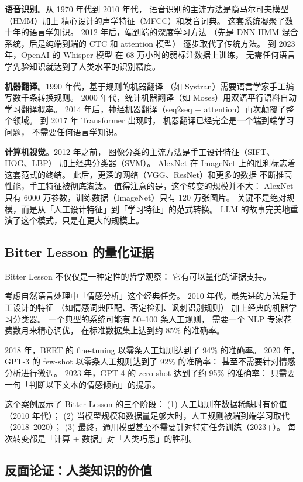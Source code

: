 \textbf{语音识别}。从 1970 年代到 2010 年代，
语音识别的主流方法是隐马尔可夫模型（HMM）加上
精心设计的声学特征（MFCC）和发音词典。
这套系统凝聚了数十年的语言学知识。
2012 年后，端到端的深度学习方法
（先是 DNN-HMM 混合系统，后是纯端到端的 CTC 和 attention 模型）
逐步取代了传统方法。
到 2023 年，OpenAI 的 Whisper 模型
在 68 万小时的弱标注数据上训练，
无需任何语言学先验知识就达到了人类水平的识别精度。

\textbf{机器翻译}。1990 年代，基于规则的机器翻译
（如 Systran）需要语言学家手工编写数千条转换规则。
2000 年代，统计机器翻译（如 Moses）用双语平行语料自动学习翻译概率。
2014 年后，神经机器翻译（seq2seq + attention）再次颠覆了整个领域。
到 2017 年 Transformer 出现时，
机器翻译已经完全是一个端到端学习问题，
不需要任何语言学知识。

\textbf{计算机视觉}。2012 年之前，
图像分类的主流方法是手工设计特征（SIFT、HOG、LBP）
加上经典分类器（SVM）。
AlexNet 在 ImageNet 上的胜利标志着这套范式的终结。
此后，更深的网络（VGG、ResNet）和更多的数据
不断推高性能，手工特征被彻底淘汰。
值得注意的是，这个转变的规模并不大：
AlexNet 只有 6000 万参数，训练数据（ImageNet）只有 120 万张图片。
关键不是绝对规模，而是从「人工设计特征」到「学习特征」的范式转换。
LLM 的故事完美地重演了这个模式，只是在更大的规模上。

\subsection{Bitter Lesson 的量化证据}

Bitter Lesson 不仅仅是一种定性的哲学观察：
它有可以量化的证据支持。

考虑自然语言处理中「情感分析」这个经典任务。
2010 年代，最先进的方法是手工设计的特征
（如情感词典匹配、否定检测、讽刺识别规则）
加上经典的机器学习分类器。
一个典型的系统可能有 50--100 条人工规则，
需要一个 NLP 专家花费数月来精心调优，
在标准数据集上达到约 85\% 的准确率。

2018 年，BERT 的 fine-tuning 以零条人工规则达到了 94\% 的准确率。
2020 年，GPT-3 的 few-shot 以零条人工规则达到了 92\% 的准确率：
甚至不需要针对情感分析进行微调。
2023 年，GPT-4 的 zero-shot 达到了约 95\% 的准确率：
只需要一句「判断以下文本的情感倾向」的提示。

这个案例展示了 Bitter Lesson 的三个阶段：
(1) 人工规则在数据稀缺时有价值（2010 年代）；
(2) 当模型规模和数据量足够大时，人工规则被端到端学习取代（2018--2020）；
(3) 最终，通用模型甚至不需要针对特定任务训练（2023+）。
每次转变都是「计算 + 数据」对「人类巧思」的胜利。

\subsection{反面论证：人类知识的价值}

